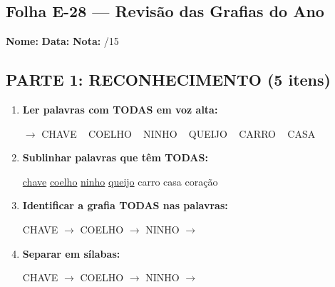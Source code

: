 \subsection{Folha E-28 --- Revisão das Grafias do Ano}
\begin{exercicio}



\noindent\textbf{Nome:} \underline{\hspace{3.2cm}} \quad \textbf{Data:} \underline{\hspace{1.6cm}} \quad \textbf{Nota:} \underline{\hspace{0.9cm}}/15


\subsection*{PARTE 1: RECONHECIMENTO (5 itens)}

\begin{enumerate}

  \item \textbf{Ler palavras com TODAS em voz alta:}
  \begin{center}
  $\rightarrow$ CHAVE ~ COELHO ~ NINHO ~ QUEIJO ~ CARRO ~ CASA
  \end{center}

  \item \textbf{Sublinhar palavras que têm TODAS:}

\begin{center}
  \uline{chave} \quad \uline{coelho} \quad \uline{ninho} \quad \uline{queijo} \quad carro \quad casa \quad coração
\end{center}

  \item \textbf{Identificar a grafia TODAS nas palavras:}
  \begin{center}
  CHAVE $\rightarrow$ \underline{\hspace{1cm}} \quad COELHO $\rightarrow$ \underline{\hspace{1cm}} \quad NINHO $\rightarrow$ \underline{\hspace{1cm}}
  \end{center}

  \item \textbf{Separar em sílabas:}
  \begin{center}
  CHAVE $\rightarrow$ \underline{\hspace{1.2cm}} \quad COELHO $\rightarrow$ \underline{\hspace{1.2cm}} \quad NINHO $\rightarrow$ \underline{\hspace{1.2cm}}
  \end{center}


\end{enumerate}
\end{exercicio}
